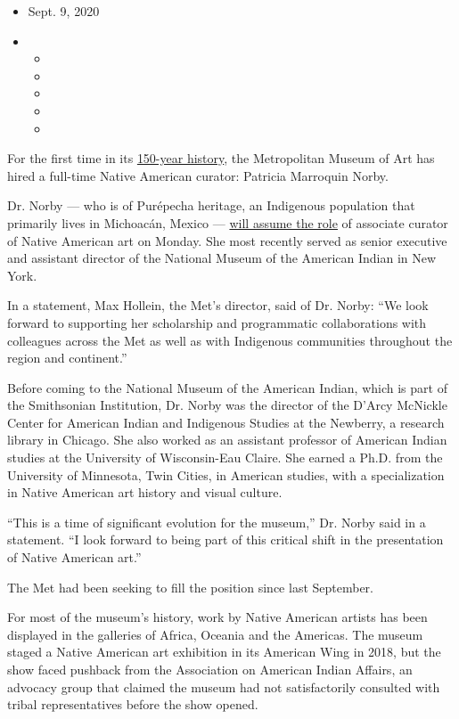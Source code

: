 \begin{itemize}
\item
  Sept. 9, 2020
\item
  \begin{itemize}
  \item
  \item
  \item
  \item
  \item
  \end{itemize}
\end{itemize}

For the first time in its
\href{https://www.nytimes3xbfgragh.onion/2020/08/27/arts/design/met-museum-reopens-anniversary.html}{150-year
history}, the Metropolitan Museum of Art has hired a full-time Native
American curator: Patricia Marroquin Norby.

Dr. Norby --- who is of Purépecha heritage, an Indigenous population
that primarily lives in Michoacán, Mexico ---
\href{https://slack-redir.net/link?url=https\%3A\%2F\%2Fwww.metmuseum.org\%2Fpress\%2Fnews\%2F2020\%2Fpatricia-marroquin-norby}{will
assume the role} of associate curator of Native American art on Monday.
She most recently served as senior executive and assistant director of
the National Museum of the American Indian in New York.

In a statement, Max Hollein, the Met's director, said of Dr. Norby: ``We
look forward to supporting her scholarship and programmatic
collaborations with colleagues across the Met as well as with Indigenous
communities throughout the region and continent.''

Before coming to the National Museum of the American Indian, which is
part of the Smithsonian Institution, Dr. Norby was the director of the
D'Arcy McNickle Center for American Indian and Indigenous Studies at the
Newberry, a research library in Chicago. She also worked as an assistant
professor of American Indian studies at the University of Wisconsin-Eau
Claire. She earned a Ph.D. from the University of Minnesota, Twin
Cities, in American studies, with a specialization in Native American
art history and visual culture.

``This is a time of significant evolution for the museum,'' Dr. Norby
said in a statement. ``I look forward to being part of this critical
shift in the presentation of Native American art.''

The Met had been seeking to fill the position since last September.

For most of the museum's history, work by Native American artists has
been displayed in the galleries of Africa, Oceania and the Americas. The
museum staged a Native American art exhibition in its American Wing in
2018, but the show faced pushback from the Association on American
Indian Affairs, an advocacy group that claimed the museum had not
satisfactorily consulted with tribal representatives before the show
opened.

